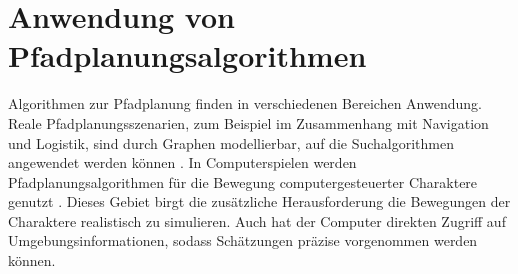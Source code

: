 

\chapter{Anwendung von Pfadplanungsalgorithmen}

Algorithmen zur Pfadplanung finden in verschiedenen Bereichen Anwendung. Reale Pfadplanungsszenarien, zum Beispiel im Zusammenhang mit Navigation und Logistik, sind durch Graphen modellierbar, auf die Suchalgorithmen angewendet werden können \cite{Botea.2011}. In Computerspielen werden Pfadplanungsalgorithmen für die Bewegung computergesteuerter Charaktere genutzt \cite[S.2]{Kri09}. Dieses Gebiet birgt die zusätzliche Herausforderung die Bewegungen der Charaktere realistisch zu simulieren. Auch hat der Computer direkten Zugriff auf Umgebungsinformationen, sodass Schätzungen präzise  vorgenommen werden können.



